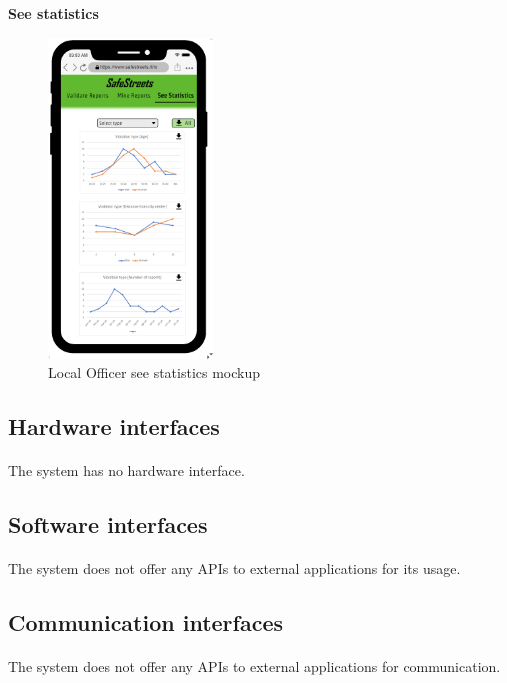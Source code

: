 					\clearpage
					\vspace{-2mm}
				\begin{center}
					{\small \textbf{See statistics}}
				\end{center}
				\vspace{-5mm}
				\begin{figure}[!h]
					\centering
					\includegraphics[height=8.5cm]{images/MockUp/Authority/LocalOfficer/SeeStatistics.png}
					\caption{Local Officer see statistics mockup}
				\end{figure}
			\subsection{Hardware interfaces}
				\paragraph{}
					The system has no hardware interface.
			\subsection{Software interfaces}
				\paragraph{}
					The system does not offer any APIs to external applications for its usage.
			\subsection{Communication interfaces}
				\paragraph{}
					The system does not offer any APIs to external applications for communication.
